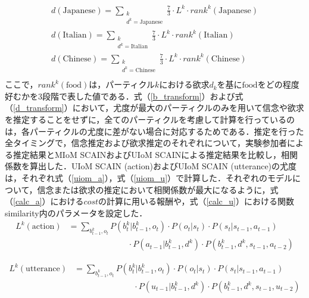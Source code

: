 \begin{equation}
  \begin{split}
  \label{d_transform}
  d(\mathrm{Japanese})= \sum_{\substack{k\\d^k=\mathrm{Japanese}}} \frac{7}{3}\cdot L^k \cdot rank^k({\mathrm{Japanese}})\\
  d(\mathrm{Italian})= \sum_{\substack{k\\d^k=\mathrm{Italian}}} \frac{7}{3}\cdot L^k \cdot rank^k({\mathrm{Italian}})\\
  d(\mathrm{Chinese})= \sum_{\substack{k\\d^k=\mathrm{Chinese}}} \frac{7}{3}\cdot L^k \cdot rank^k({\mathrm{Chinese}})\\
  \end{split}
\end{equation}
ここで，$rank^k(\mathrm{food})$は，パーティクル$k$における欲求$d_k$を基に$\mathrm{food}$をどの程度好むかを3段階で表した値である．式（\ref{b_transform}）および式（\ref{d_transform}）において，尤度が最大のパーティクルのみを用いて信念や欲求を推定することをせずに，全てのパーティクルを考慮して計算を行っているのは，各パーティクルの尤度に差がない場合に対応するためである．推定を行った全タイミングで，信念推定および欲求推定のそれぞれについて，実験参加者による推定結果とMIoM SCAINおよびUIoM SCAINによる推定結果を比較し，相関係数を算出した．UIoM SCAIN (action)およびUIoM SCAIN (utterance)の尤度は，それぞれ式（\ref{uiom_a}），式（\ref{uiom_u}）で計算した．それぞれのモデルについて，信念または欲求の推定において相関係数が最大になるように，式（\ref{calc_a}）における$cost$の計算に用いる報酬や，式（\ref{calc_u}）における関数similarity内のパラメータを設定した．
\begin{equation}
  \begin{split}
  \label{uiom_a}
  L^k({\mathrm{action}})&= \sum_{b_{t-1}^k,o_t}P(b_t^k|b_{t-1}^k,o_t)\cdot P(o_t|s_t)\cdot P(s_t|s_{t-1},a_{t-1})\\
  &\hspace{3cm}\cdot P(a_{t-1}|b_{t-1}^k,d^k)\cdot P(b_{t-1}^k,d^k,s_{t-1},a_{t-2})
  \end{split}
\end{equation}

\begin{equation}
  \begin{split}
  \label{uiom_u}
  L^k({\mathrm{utterance}})&= \sum_{b_{t-1}^k,o_t}P(b_t^k|b_{t-1}^k,o_t)\cdot P(o_t|s_t)\cdot P(s_t|s_{t-1},a_{t-1})\\
  &\hspace{3cm}\cdot P(u_{t-1}|b_{t-1}^k,d^k)\cdot P(b_{t-1}^k,d^k,s_{t-1},u_{t-2})
  \end{split}
\end{equation}


